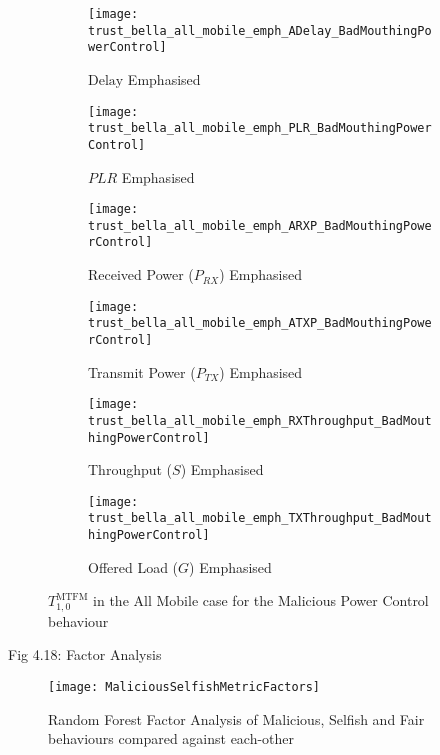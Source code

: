 \documentclass[aspectratio=43]{beamer}
\begin{document}
\begin{frame}
	\begin{figure}[h]
		\centering
		\begin{subfigure}{0.3\textwidth}
			\texttt{[image: trust\_bella\_all\_mobile\_emph\_ADelay\_BadMouthingPowerControl]} 
			\caption{$\text{Delay}$ Emphasised}
			\label{fig:all_mobile_badmouthing_delay}
		\end{subfigure}
		\begin{subfigure}{0.3\textwidth}
			\texttt{[image: trust\_bella\_all\_mobile\_emph\_PLR\_BadMouthingPowerControl]} 
			\caption{$PLR$ Emphasised}
			\label{fig:all_mobile_badmouthing_plr}
		\end{subfigure}
		\begin{subfigure}{0.3\textwidth}
			\texttt{[image: trust\_bella\_all\_mobile\_emph\_ARXP\_BadMouthingPowerControl]} 
			\caption{Received Power ($P_{RX}$) Emphasised}
			\label{fig:all_mobile_badmouthing_rxp}
		\end{subfigure}	
		\begin{subfigure}{0.3\textwidth}
			\texttt{[image: trust\_bella\_all\_mobile\_emph\_ATXP\_BadMouthingPowerControl]} 
			\caption{Transmit Power ($P_{TX}$) Emphasised}
			\label{fig:all_mobile_badmouthing_txp}
		\end{subfigure}
		\begin{subfigure}{0.3\textwidth}
			\texttt{[image: trust\_bella\_all\_mobile\_emph\_RXThroughput\_BadMouthingPowerControl]} 
			\caption{Throughput ($S$) Emphasised}
			\label{fig:all_mobile_badmouthing_rxthroughput}
		\end{subfigure}
		\begin{subfigure}{0.3\textwidth}
			\texttt{[image: trust\_bella\_all\_mobile\_emph\_TXThroughput\_BadMouthingPowerControl]} 
			\caption{Offered Load ($G$) Emphasised}
			\label{fig:all_mobile_badmouthing_txthroughput}
		\end{subfigure}
		\caption{$T_{1,0}^\text{MTFM}$ in the All Mobile case for the Malicious Power Control behaviour}
		\label{fig:all_mobile_badmouthing}
	\end{figure}
\end{frame}

\begin{frame}{Fig 4.18: Factor Analysis}
	\begin{figure}
		\centering
		\texttt{[image: MaliciousSelfishMetricFactors]}
		\caption{Random Forest Factor Analysis of Malicious, Selfish and Fair behaviours compared against each-other}
		\label{fig:malselfactors}
	\end{figure}
\end{frame}
\end{document}
